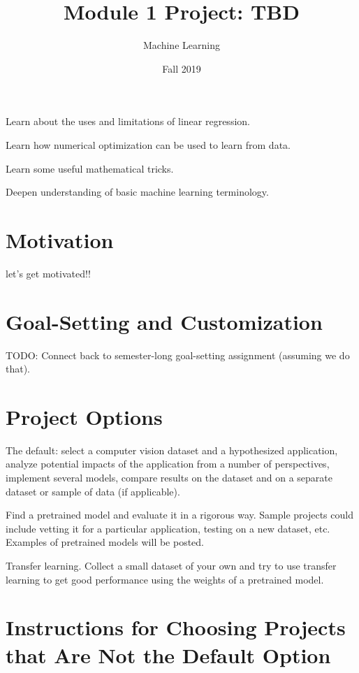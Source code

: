 \documentclass{tufte-handout}
\title{Module 1 Project: TBD}
\author{Machine Learning}
\date{Fall 2019}
\begin{document}
\maketitle
\thispagestyle{firstpage}

\begin{learningobjectives}
\bi
\item Learn about the uses and limitations of linear regression.
\item Learn how numerical optimization can be used to learn from data.
\item Learn some useful mathematical tricks.
\item Deepen understanding of basic machine learning terminology.
\ei
\end{learningobjectives}

\section*{Motivation}

let's get motivated!!

\section{Goal-Setting and Customization}

TODO: Connect back to semester-long goal-setting assignment (assuming we do that).

\section{Project Options}
\bi
\item The default: select a computer vision dataset and a hypothesized application, analyze potential impacts of the application from a number of perspectives, implement several models, compare results on the dataset and on a separate dataset or sample of data (if applicable).
\item Find a pretrained model and evaluate it in a rigorous way.  Sample projects could include vetting it for a particular application, testing on a new dataset, etc.  Examples of pretrained models will be posted.
\item Transfer learning.  Collect a small dataset of your own and try to use transfer learning to get good performance using the weights of a pretrained model.
\ei

\section{Instructions for Choosing Projects that Are Not the Default Option}
\end{document}
